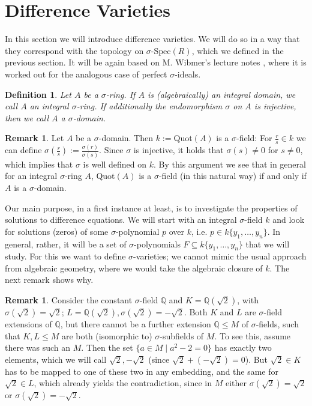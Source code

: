 \documentclass{article}
\def\Q{\mathbb{Q}}
\def\s{\sigma}
\def\sSpec{\sigma\text{-Spec}}
\theoremstyle{plain}
\newtheorem{defn}[Satz]{Definition}
\theoremstyle{definition}
\newtheorem{rem}[Satz]{Remark}
\begin{document}
\clearpage
\section{Difference Varieties}


In this section we will introduce difference varieties. We will do so in a way that they correspond with the topology on $\sSpec(R)$, which we defined in the previous section. It will be again based on M. Wibmer's lecture notes \cite{wibmer}, 
where it is worked out for the analogous case of perfect $\s$-ideals.

\begin{defn}
Let $A$ be a $\s$-ring. If $A$ is (algebraically) an integral domain, we call $A$ an \emph{integral $\s$-ring}. If additionally the endomorphism $\s$ on $A$ is injective, then we call $A$ a \emph{$\s$-domain}. \index{integral $\s$-ring} \index{$\s$-domain}
\end{defn}

\begin{rem}\label{sdomain=field}
Let $A$ be a $\s$-domain. Then $k:=$Quot$(A)$ is a $\s$-field: For $\frac{r}{s} \in k$ we can define $\s(\frac{r}{s}):= \frac{\s(r)}{\s(s)}$. Since $\s$ is injective, it holds that $\s(s) \neq 0$ for $s \neq 0$, which implies that $\s$ is well defined on $k$.
By this argument we see that in general for an integral $\s$-ring $A$, Quot$(A)$ is a $\s$-field (in this natural way) if and only if $A$ is a $\s$-domain.
\end{rem}

Our main purpose, in a first instance at least, is to investigate the properties of solutions to difference equations. 
We will start with an integral $\s$-field $k$ and look for solutions (zeros) of some $\s$-polynomial $p$ over $k$, i.e. $p \in k\{y_1, \ldots, y_n \}$. In general, rather, it will be a set of $\s$-polynomials $F \subseteq k\{y_1, \ldots, y_n \}$ that we will study. 
For this we want to define $\s$-varieties; we cannot mimic the usual approach from algebraic geometry, where we would take the algebraic closure of $k$. The next remark shows why.

\begin{rem}\label{incompatibleextensions}
 Consider the constant $\s$-field $\Q$ and $K = \Q(\sqrt{2})$, with $\s (\sqrt{2}) = \sqrt{2}$; $L = \Q(\sqrt{2}), \s(\sqrt{2}) = - \sqrt{2}$. 
Both $K$ and $L$ are $\s$-field extensions of $\Q$, but there cannot be a further extension $\Q \leq M$ of $\s$-fields, such that $K,L \leq M$ are both (isomorphic to) $\s$-subfields of $M$. 
To see this, assume there was such an $M$. Then the set $\{ a \in M \mid a^2 - 2 = 0 \}$ has exactly two elements, which we will call $\sqrt{2}, -\sqrt{2}$ (since $\sqrt{2} + (- \sqrt{2}) = 0$).
But $\sqrt{2} \in K$ has to be mapped to one of these two in any embedding, and the same for $\sqrt{2} \in L$, which already yields the contradiction,
 since in $M$ either $\s(\sqrt{2}) = \sqrt{2}$ or $\s(\sqrt{2}) = -\sqrt{2}$.
\end{rem}
\end{document}

